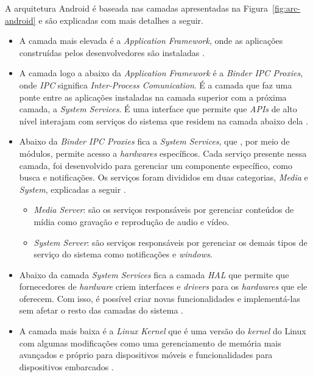 A arquitetura Android é baseada nas camadas apresentadas na Figura~\ref{fig:arc-android} e são explicadas com mais detalhes a seguir.

\begin{itemize}

    \item A camada mais elevada é a \textit{Application Framework}, onde as aplicações construídas pelos desenvolvedores são instaladas \cite{android_android_2016}.
    \item A camada logo a abaixo da \textit{Application Framework} é a \textit{Binder IPC Proxies}, onde \textit{IPC} significa \textit{Inter-Process Comunication}.
    É a camada que faz uma ponte entre as aplicações instaladas na camada superior com a próxima camada, a \textit{System Services}. É uma interface que permite que \textit{APIs}
    de alto nível interajam com serviços do sistema que residem na camada abaixo dela \cite{android_android_2016}. 
    \item Abaixo da \textit{Binder IPC Proxies} fica a \textit{System Services}, que , por meio de módulos, permite acesso a \textit{hardwares} específicos. Cada serviço presente nessa camada,
    foi desenvolvido para gerenciar um componente específico, como busca e notificações. Os serviços foram divididos em duas categorias, \textit{Media} e \textit{System}, explicadas a seguir \cite{android_android_2016}.
    \begin{itemize}
        \item \textit{Media Server}: são os serviços responsáveis por gerenciar conteúdos de mídia como gravação e reprodução de audio e vídeo. 
        \item \textit{System Server}: são serviços responsáveis por gerenciar os demais tipos de serviço do sistema como notificações e \textit{windows}.
    \end{itemize}
    \item Abaixo da camada \textit{System Services} fica a camada \textit{HAL} que permite que fornecedores de \textit{hardware} criem interfaces e \textit{drivers} para os \textit{hardwares} que
    ele oferecem. Com isso, é possível criar novas funcionalidades e implementá-las sem afetar o resto das camadas do sistema \cite{android_android_2016}.  
    \item A camada mais baixa é a \textit{Linux Kernel} que é uma versão do \textit{kernel} do Linux com algumas modificações como uma gerenciamento de memória mais avançados e próprio para dispositivos 
    móveis e funcionalidades para dispositivos embarcados \cite{android_android_2016}. 
    
\end{itemize}

